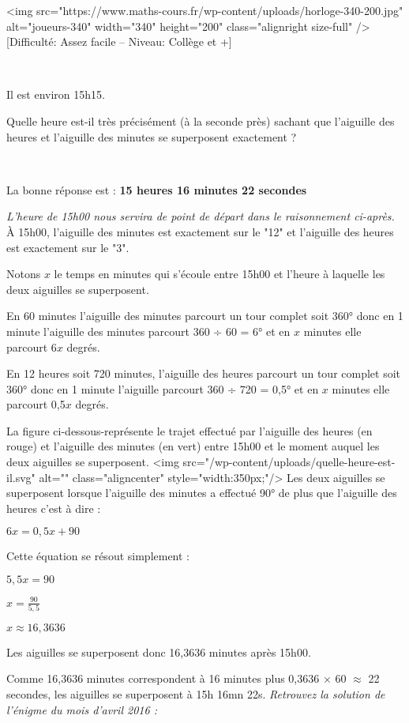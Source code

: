 
%
<img src="https://www.maths-cours.fr/wp-content/uploads/horloge-340-200.jpg" alt="joueurs-340" width="340" height="200" class="alignright size-full" />
[Difficulté: Assez facile – Niveau: Collège et +]
\par
~
\par
Il est environ 15h15.
\par
Quelle heure est-il très précisément (à la seconde près) sachant que l'aiguille des heures et l'aiguille des minutes se superposent exactement ?
\par
~
\begin{note}La bonne réponse est : \textbf{15 heures 16 minutes 22 secondes}\end{note}
\textit{L'heure de 15h00 nous servira de point de départ dans le raisonnement ci-après.}
À 15h00, l'aiguille des minutes est exactement sur le "12" et l'aiguille des heures est exactement sur le "3".
\par
Notons $x$ le temps en minutes qui s'écoule entre 15h00 et l'heure à laquelle les deux aiguilles se superposent.
\par
En  60 minutes l'aiguille des minutes parcourt un tour complet soit 360° donc en 1 minute l'aiguille des minutes parcourt  360 ÷ 60 = 6° et en $x$ minutes elle parcourt 6$x$ degrés.
\par
En 12 heures soit 720 minutes, l'aiguille des heures parcourt un tour complet soit 360° donc en 1 minute l'aiguille parcourt 360  ÷ 720 = 0,5° et en $x$ minutes elle parcourt 0,5$x$ degrés.
\par
La figure ci-dessous-représente le trajet effectué par l'aiguille des heures (en rouge) et l'aiguille des minutes (en vert) entre 15h00 et le moment auquel les deux aiguilles se superposent.
<img src="/wp-content/uploads/quelle-heure-est-il.svg" alt="" class="aligncenter" style="width:350px;"/>
Les deux aiguilles se superposent lorsque l'aiguille des minutes a effectué 90° de plus que l'aiguille des heures c'est à dire :
\par
$6x=0,5x+90$
\par
Cette équation se résout simplement :
\par
$5,5x=90$
\par
$x=\frac{90}{5,5}$
\par
$x \approx 16,3636$
\par
Les aiguilles se superposent donc 16,3636 minutes après 15h00.
\par
Comme 16,3636 minutes correspondent à 16 minutes plus 0,3636 $\times$ 60 $\approx$ 22 secondes, les aiguilles se superposent à 15h 16mn 22s.
\textit{Retrouvez la solution de l'énigme du mois d'avril 2016 : }
